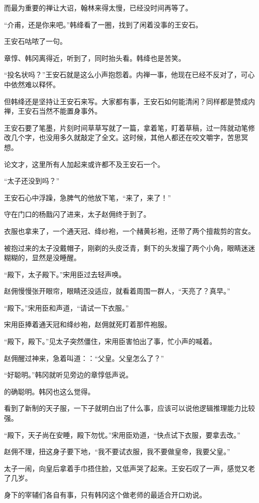 而最为重要的禅让大诏，翰林来得太慢，已经没时间再等了。

“介甫，还是你来吧。”韩绛看了一圈，找到了闲着没事的王安石。

王安石咕哝了一句。

章惇、韩冈离得近，听到了，同时抬头看。韩绛也是苦笑。

“投名状吗？”王安石就是这么小声抱怨着。内禅一事，他现在已经不反对了，可心中依然难以释怀。

但韩绛还是坚持让王安石来写。大家都有事，王安石如何能清闲？同样都是赞成内禅，王安石当然不能置身事外。

王安石要了笔墨，片刻时间草草写就了一篇，拿着笔，盯着草稿，过一阵就动笔修改几个字，也没用多久就敲定了全文。这时候，其他人都还在咬文嚼字，苦思冥想。

论文才，这里所有人加起来或许都不及王安石一个。

“太子还没到吗？”

王安石心中浮躁，急脾气的他放下笔，“来了，来了！”

守在门口的杨戬闪了进来，太子赵佣终于到了。

衣服也拿来了，一个通天冠、绛纱袍，一个赭黄衫袍，还带了两个擅裁剪的宫女。

被抱过来的太子没戴帽子，刚剃的头皮泛青，剩下的头发撮了两个小角，眼睛迷迷糊糊的，显然是没睡醒。

“殿下，太子殿下。”宋用臣过去轻声唤。

赵佣慢慢张开眼帘，眼睛还没适应，就看着周围一群人，“天亮了？真早。”

“殿下。”宋用臣和声道，“请试一下衣服。”

宋用臣捧着通天冠和绛纱袍，赵佣就死盯着那件袍服。

“殿下，殿下。”见太子突然僵住，宋用臣害怕出了事，忙小声的喊着。

赵佣醒过神来，急着叫道：：“父皇。父皇怎么了？”

“好聪明。”韩冈就听见旁边的章惇低声说。

的确聪明。韩冈也这么觉得。

看到了新制的天子服，一下子就明白出了什么事，应该可以说他逻辑推理能力比较强。

“殿下，天子尚在安睡，殿下勿忧。”宋用臣劝道，“快点试下衣服，要拿去改。”

赵佣不理，扭这身子要下地，“我不要试衣服，我不要做皇帝，我要父皇。”

太子一闹，向皇后拿着手巾捂住脸，又低声哭了起来。王安石叹了一声，感觉又老了几岁。

身下的宰辅们各自有事，只有韩冈这个做老师的最适合开口劝说。

